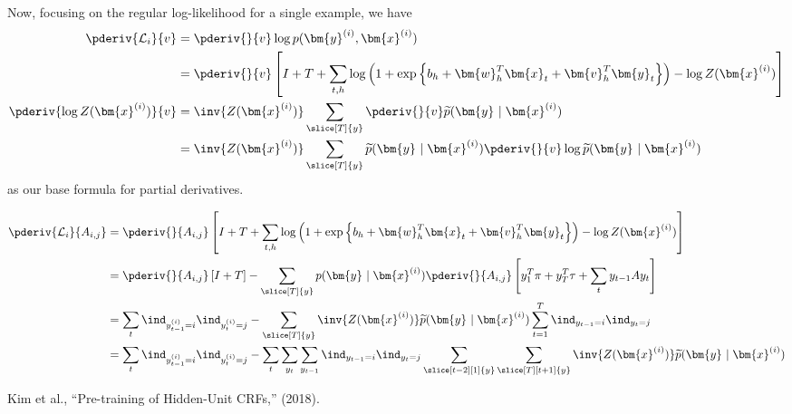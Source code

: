 \documentclass[11pt]{article}
\renewcommand\vec[2][]{\bm{#2}_{#1}}
\begin{document}
Now, focusing on the regular log-likelihood for a single example, we have
\begin{align}
	\pderiv{\mathcal{L}_i}{v}
		&= \pderiv{}{v} \log p(\vec{y}^{(i)}, \vec{x}^{(i)}) \\
		&= \pderiv{}{v} \left[ 
			I + T + 
			\sum_{t, h} \log\left( 1 + \exp\left\{
				b_h + \vec[h]{w}^T \vec[t]{x} + \vec[h]{v}^T \vec[t]{y} 
				\right\}\right) - 
			\log Z(\vec{x}^{(i)})
			\right] \\
	\pderiv{\log Z(\vec{x}^{(i)})}{v} 
		&= \inv{Z(\vec{x}^{(i)})}   \sum_{\slice[T]{y}} \pderiv{}{v} \widetilde{p}(\vec{y} \mid \vec{x}^{(i)}) \\
		&= \inv{Z(\vec{x}^{(i)})}   \sum_{\slice[T]{y}} \widetilde{p}(\vec{y} \mid \vec{x}^{(i)}) \pderiv{}{v} \log\widetilde{p}(\vec{y} \mid \vec{x}^{(i)})
\end{align}
as our base formula for partial derivatives. 

\begin{example}
	\begin{align}
	\pderiv{\mathcal{L}_i}{A_{i,j}} 
	&= \pderiv{}{A_{i,j}} \left[ 
		I + T + 
		\sum_{t, h} \log\left( 1 + \exp\left\{
		b_h + \vec[h]{w}^T \vec[t]{x} + \vec[h]{v}^T \vec[t]{y} 
		\right\}\right) - 
		\log Z(\vec{x}^{(i)})
		\right] \\
	&= \pderiv{}{A_{i,j}} \left[ I + T \right]
		- \sum_{\slice[T]{y}}  p(\vec{y} \mid \vec{x}^{(i)}) \pderiv{}{A_{i,j}} \left[ 
			y_1^T \pi + y_T^T \tau + \sum_t y_{t-1}Ay_t \right] \\
	&= \sum_t \ind_{y_{t-1}^{(i)}=i} \ind_{y_{t}^{(i)}=j}
		- \sum_{\slice[T]{y}} \inv{Z(\vec{x}^{(i)})} \widetilde{p}(\vec{y} \mid \vec{x}^{(i)}) \sum_{t=1}^{T} \ind_{y_{t-1}=i} \ind_{y_{t}=j} \\
	&= \sum_t \ind_{y_{t-1}^{(i)}=i} \ind_{y_{t}^{(i)}=j}
		- \sum_t \sum_{y_t} \sum_{y_{t-1}}   \ind_{y_{t-1}=i} \ind_{y_{t}=j} \sum_{ \slice[t-2][1]{y} } \sum_{  \slice[T][t+1]{y}} \inv{Z(\vec{x}^{(i)})} \widetilde{p}(\vec{y} \mid \vec{x}^{(i)})
	\end{align}
\end{example}










\vspace{-1em}
{\footnotesize Kim et al., ``Pre-training of Hidden-Unit CRFs,'' (2018).}
\end{document}
